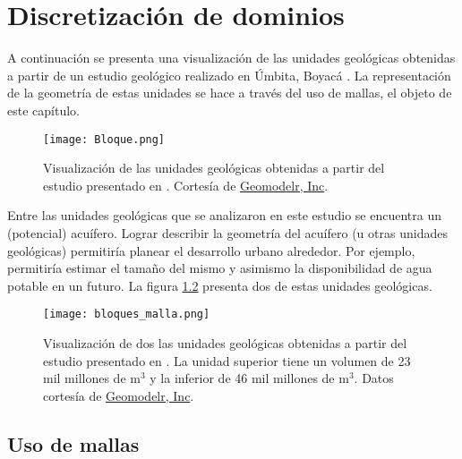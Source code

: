 \chapter{Discretización de dominios}
\graphicspath{{img/discret/}}

A continuación se presenta una visualización de las unidades geológicas obtenidas a partir de un estudio geológico realizado en Úmbita, Boyacá \cite{thesis:borda2017, geomodelr}. La representación de la geometría de estas unidades se hace a través del uso de mallas, el objeto de este capítulo.
\begin{figure}[H]
    \centering
    \texttt{[image: Bloque.png]}
    \caption{Visualización de las unidades geológicas obtenidas a partir del estudio presentado en \cite{thesis:borda2017}. Cortesía de \href{https://geomodelr.com/}{Geomodelr, Inc}.}
    \label{fig:geomodelr}
\end{figure}

Entre las unidades geológicas que se analizaron en este estudio se encuentra un (potencial) acuífero. Lograr describir la geometría del acuífero (u otras unidades geológicas) permitiría planear el desarrollo urbano alrededor. Por ejemplo, permitiría estimar el tamaño del mismo y asimismo la disponibilidad de agua potable en un futuro. La figura \ref{fig:unidades_aisladas} presenta dos de estas unidades geológicas.
\begin{figure}[H]
    \centering
    \texttt{[image: bloques\_malla.png]}
    \caption{Visualización de dos las unidades geológicas obtenidas a partir 
    del estudio presentado en \cite{thesis:borda2017}. La unidad superior tiene 
    un volumen de 23 mil millones de m$^3$ y la inferior de 46 mil millones de 
    m$^3$. Datos cortesía de \href{https://geomodelr.com/}{Geomodelr, Inc}.}
    \label{fig:unidades_aisladas}
\end{figure}


\pagebreak
\section{Uso de mallas}

